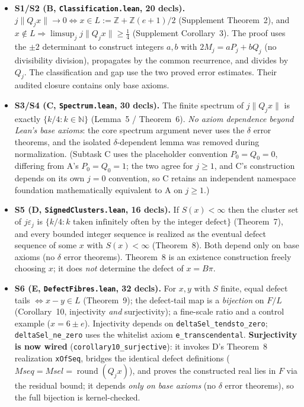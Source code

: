 \documentclass[11pt]{amsart}
\theoremstyle{definition}
\theoremstyle{remark}
\numberwithin{equation}{section}
\newcommand{\Z}{\mathbb{Z}}
\newcommand{\N}{\mathbb{N}}
\newcommand{\ee}{e}
\begin{document}
\begin{itemize}
\item \textbf{S1/S2 (B, \texttt{Classification.lean}, 20 decls).} $j\|Q_j x\|\to0\iff x\in L:=\Z+\Z(\ee+1)/2$ (Supplement Theorem~2), and $x\notin L\Rightarrow\limsup_j j\|Q_j x\|\ge\tfrac14$ (Supplement Corollary~3). The proof uses the $\pm2$ determinant to construct integers $a,b$ with $2M_j=aP_j+bQ_j$ (no divisibility division), propagates by the common recurrence, and divides by $Q_j$. The classification and gap use the two proved error estimates. Their audited closure contains only base axioms.
\item \textbf{S3/S4 (C, \texttt{Spectrum.lean}, 30 decls).} The finite spectrum of $j\|Q_j x\|$ is exactly $\{k/4:k\in\N\}$ (Lemma~5 / Theorem~6). \emph{No axiom dependence beyond Lean's base axioms}: the core spectrum argument never uses the $\delta$ error theorems, and the isolated $\delta$-dependent lemma was removed during normalization. (Subtask C uses the placeholder convention $P_0=Q_0=0$, differing from A's $P_0=Q_0=1$; the two agree for $j\ge1$, and C's construction depends on its own $j=0$ convention, so C retains an independent namespace foundation mathematically equivalent to A on $j\ge1$.)
\item \textbf{S5 (D, \texttt{SignedClusters.lean}, 16 decls).} If $S(x)<\infty$ then the cluster set of $j\varepsilon_j$ is $\{k/4:k\text{ taken infinitely often by the integer defect}\}$ (Theorem~7), and every bounded integer sequence is realized as the eventual defect sequence of some $x$ with $S(x)<\infty$ (Theorem~8). Both depend only on base axioms (no $\delta$ error theorems). Theorem~8 is an existence construction freely choosing $x$; it does \emph{not} determine the defect of $x=B\pi$.
\item \textbf{S6 (E, \texttt{DefectFibres.lean}, 32 decls).} For $x,y$ with $S$ finite, equal defect tails $\iff x-y\in L$ (Theorem~9); the defect-tail map is a \emph{bijection} on $F/L$ (Corollary~10, injectivity \emph{and} surjectivity); a fine-scale ratio and a control example ($x=6\pm\ee$). Injectivity depends on \texttt{deltaSel\_\allowbreak{}tendsto\_\allowbreak{}zero}; \texttt{deltaSel\_\allowbreak{}ne\_\allowbreak{}zero} uses the whitelist axiom \texttt{e\_\allowbreak{}transcendental}. \textbf{Surjectivity is now wired} (\texttt{corollary10\_\allowbreak{}surjective}): it invokes D's Theorem~8 realization \texttt{xOfSeq}, bridges the identical defect definitions ($Mseq=Msel=\operatorname{round}(Q_j x)$), and proves the constructed real lies in $F$ via the residual bound; it depends \emph{only on base axioms} (no $\delta$ error theorems), so the full bijection is kernel-checked.

\end{itemize}
\end{document}
